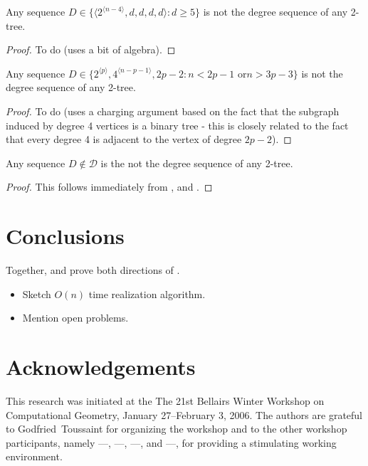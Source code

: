 \documentclass[lotsofwhite,charterfonts]{patmorin}
\newcommand{\rep}[1]{^{\langle#1\rangle}}
\begin{document}
\begin{lem}
Any sequence $D\in\{\langle 2\rep{n-4},d,d,d,d\rangle : d\ge 5\}$ is not 
the degree sequence of any 2-tree.
\end{lem}

\begin{proof}
To do (uses a bit of algebra).
\end{proof}


\begin{lem}
Any sequence $D\in\{2\rep{p},4\rep{n-p-1}, 2p-2 : \mbox{$n < 2p-1$ or
$n > 3p-3$} \}$ is not the degree sequence of any 2-tree.
\end{lem}

\begin{proof}
To do (uses a charging argument based on the fact that the subgraph
induced by degree 4 vertices is a binary tree - this is closely
related to the fact that every degree 4 is adjacent to the vertex of
degree $2p-2$).
\end{proof}

\begin{lem}
Any sequence $D\not\in \mathcal{D}$ is the not the degree sequence of
any 2-tree.
\end{lem}

\begin{proof}
This follows immediately from ,  and
.
\end{proof}

\section{Conclusions}

Together,  and  prove both directions of
.

\begin{itemize}
\item Sketch $O(n)$ time realization algorithm.
\item Mention open problems.
\end{itemize}

\section{Acknowledgements}

This research was initiated at the The 21st Bellairs Winter Workshop
on Computational Geometry, January 27--February 3, 2006.  The authors
are grateful to Godfried~Toussaint for organizing the workshop and to
the other workshop participants, namely
---,
---,
---, and
---,
for providing a stimulating working environment.




\end{document}

